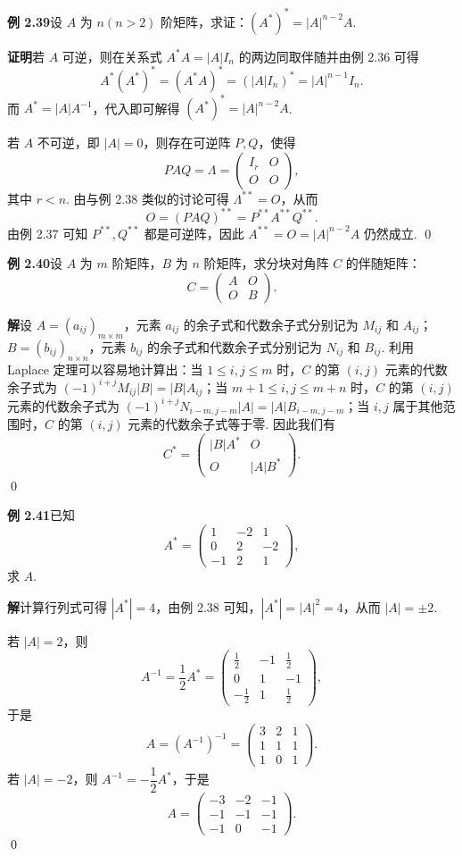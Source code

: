 \documentclass[UTF8, 12pt, fontset=fandol, oneside]{ctexart}
\begin{document}
\noindent\textbf{例 2.39}\quad 设 $A$ 为 $n(n>2)$ 阶矩阵，求证：$(A^*)^*=|A|^{n-2}A$.

\noindent\textbf{证明}\quad 若 $A$ 可逆，则在关系式 $A^*A=|A|I_n$ 的两边同取伴随并由例 2.36 可得
\[
A^*(A^*)^*=(A^*A)^*=(|A|I_n)^*=|A|^{n-1}I_n.
\]
而 $A^*=|A|A^{-1}$，代入即可解得 $(A^*)^*=|A|^{n-2}A$.

若 $A$ 不可逆，即 $|A|=0$，则存在可逆阵 $P,Q$，使得
\[
PAQ=\Lambda=
\left(
\begin{array}{cc}
I_r & O\\
O & O
\end{array}
\right),
\]
其中 $r<n$. 由与例 2.38 类似的讨论可得 $\Lambda^{**}=O$，从而
\[
O=(PAQ)^{**}=P^{**}A^{**}Q^{**}.
\]
由例 2.37 可知 $P^{**},Q^{**}$ 都是可逆阵，因此 $A^{**}=O=|A|^{n-2}A$ 仍然成立. \qed

\noindent\textbf{例 2.40}\quad 设 $A$ 为 $m$ 阶矩阵，$B$ 为 $n$ 阶矩阵，求分块对角阵 $C$ 的伴随矩阵：
\[
C=
\left(
\begin{array}{cc}
A & O\\
O & B
\end{array}
\right).
\]

\noindent\textbf{解}\quad 设 $A=(a_{ij})_{m\times m}$，元素 $a_{ij}$ 的余子式和代数余子式分别记为 $M_{ij}$ 和 $A_{ij}$；$B=(b_{ij})_{n\times n}$，元素 $b_{ij}$ 的余子式和代数余子式分别记为 $N_{ij}$ 和 $B_{ij}$. 利用 Laplace 定理可以容易地计算出：当 $1\le i,j\le m$ 时，$C$ 的第 $(i,j)$ 元素的代数余子式为 $(-1)^{i+j}M_{ij}|B|=|B|A_{ij}$；当 $m+1\le i,j\le m+n$ 时，$C$ 的第 $(i,j)$ 元素的代数余子式为 $(-1)^{i+j}N_{i-m,j-m}|A|=|A|B_{i-m,j-m}$；当 $i,j$ 属于其他范围时，$C$ 的第 $(i,j)$ 元素的代数余子式等于零. 因此我们有
\[
C^*=
\left(
\begin{array}{cc}
|B|A^* & O\\
O & |A|B^*
\end{array}
\right).
\]
\qed

\noindent\textbf{例 2.41}\quad 已知
\[
A^*=
\left(
\begin{array}{rrr}
1 & -2 & 1\\
0 & 2 & -2\\
-1 & 2 & 1
\end{array}
\right),
\]
求 $A$.

\noindent\textbf{解}\quad 计算行列式可得 $|A^*|=4$，由例 2.38 可知，$|A^*|=|A|^2=4$，从而 $|A|=\pm2$.

若 $|A|=2$，则
\[
A^{-1}=\frac12 A^*=
\left(
\begin{array}{rrr}
\frac12 & -1 & \frac12\\
0 & 1 & -1\\
-\frac12 & 1 & \frac12
\end{array}
\right),
\]
于是
\[
A=(A^{-1})^{-1}=
\left(
\begin{array}{ccc}
3 & 2 & 1\\
1 & 1 & 1\\
1 & 0 & 1
\end{array}
\right).
\]
若 $|A|=-2$，则 $A^{-1}=-\dfrac12 A^*$，于是
\[
A=
\left(
\begin{array}{rrr}
-3 & -2 & -1\\
-1 & -1 & -1\\
-1 & 0 & -1
\end{array}
\right).
\]
\qed
\end{document}
